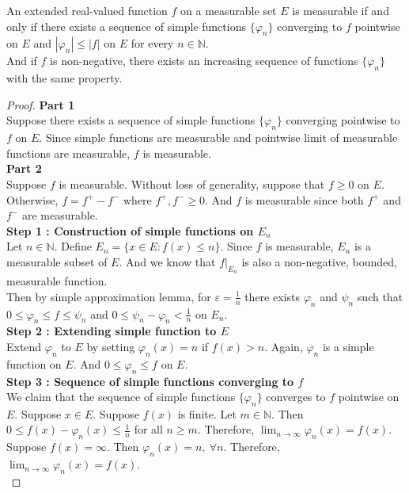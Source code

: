 \begin{theorem}
	An extended real-valued function $f$ on a measurable set $E$ is measurable if and only if there exists a sequence of simple functions $\{ \varphi_n \}$ converging to $f$ pointwise on $E$ and $|\varphi_n| \le |f|$ on $E$ for every $n \in \mathbb{N}$.\\
	And if $f$ is non-negative, there exists an increasing sequence of functions $\{ \varphi_n \}$ with the same property.
	\label{thm:simpleapproximation}
\end{theorem}
\begin{proof}
	\textbf{Part 1}\\
	Suppose there exists a sequence of simple functions $\{\varphi_n \}$ converging pointwise to $f$ on $E$.
	Since simple functions are measurable and pointwise limit of measurable functions are measurable, $f$ is measurable.\\

	\textbf{Part 2}\\	
	Suppose $f$ is measurable.
	Without loss of generality, suppose that $f \ge 0$ on $E$.
	Otherwise, $f = f^+ - f^-$ where $f^+,f^- \ge 0$.
	And $f$ is measurable since both $f^+$ and $f^-$ are measurable.\\

	\textbf{Step 1 : Construction of simple functions on $E_n$}\\
	Let $n \in \mathbb{N}$.
	Define $E_n = \{ x \in E : f(x) \le n \}$.
	Since $f$ is measurable, $E_n$ is a measurable subset of $E$.
	And we know that $f|_{E_n}$ is also a non-negative, bounded, measurable function.\\

	Then by simple approximation lemma, for $\varepsilon = \frac{1}{n}$ there exists $\varphi_n$ and $\psi_n$ such that $0 \le \varphi_n \le f \le \psi_n$ and $0 \le \psi_n - \varphi_n < \frac{1}{n}$ on $E_n$.\\

	\textbf{Step 2 : Extending simple function to $E$}\\
	Extend $\varphi_n$ to $E$ by setting $\varphi_n(x) = n$ if $f(x) > n$.
	Again, $\varphi_n$ is a simple function on $E$.
	And $0 \le \varphi_n \le f$ on $E$.\\

	\textbf{Step 3 : Sequence of simple functions converging to $f$}\\
	We claim that the sequence of simple functions $\{ \varphi_n \}$ converges to $f$ pointwise on $E$.
	Suppose $x \in E$.
	Suppose $f(x)$ is finite.
	Let $m \in \mathbb{N}$.
	Then $0 \le f(x) - \varphi_n(x) \le \frac{1}{n}$ for all $n \ge m$.
	Therefore, $\displaystyle \lim_{n \to \infty} \varphi_n(x) = f(x)$.
	Suppose $f(x) = \infty$.
	Then $\varphi_n(x) = n,\ \forall n$.
	Therefore, $\displaystyle \lim_{n \to \infty} \varphi_n(x) = f(x)$.\\


\end{proof}
